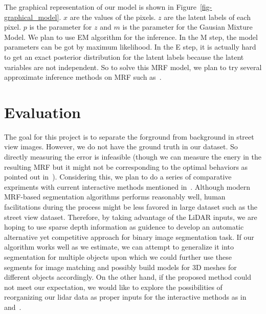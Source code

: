 \documentclass{article} %
\begin{document}
The graphical representation of our model is shown in
Figure~\ref{fig-graphical_model}. $x$ are the values of the
pixels. $z$ are the latent labels of each pixel. $p$ is the parameter
for $z$ and $m$ is the parameter for the Gausian Mixture Model. We
plan to use EM algorithm for the inference. In the M step, the model
parameters can be got by maximum likelihood. In the E step, it is
actually hard to get an exact posterior distribution for the latent
labels because the latent variables are not independent. So to solve
this MRF model, we plan to try several approximate inference methods
on MRF such as~\citep{Boykov2006graph}.

\section{Evaluation}
The goal for this project is to separate the forground from background
in street view images. However, we do not have the ground truth 
in our dataset. So directly measuring the error is infeasible
(though we can measure the enery in the resulting MRF but it 
might not be corresponding to the optimal behaviors as pointed out
in~\citet{Szeliski2008Comparative}). Considering this, we plan to do a series of
comparative expriments with current interactive methods
 mentioned in~\citep{Szeliski2008Comparative}. Although modern
 MRF-based segmentation algorithms performs reasonably well, 
human facilitations during the process might be less favored in large
dataset such as the street view dataset. Therefore,  by taking
advantage of the LiDAR inputs, we are hoping to use sparse depth
information as guidence to develop an automatic alternative yet
competitive approach for binary image segmentation task. 
If our algorithm works well as we estimate, we can attempt
to generalize it into segmentation for multiple objects upon which we
could further use these segments for image matching and possibly build
models for 3D meshes for different objects accordingly. On the other
hand, if the proposed method could not meet our expectation, we would
like to explore the possibilities of reorganizing our lidar data as
proper inputs for the interactive methods as
in~\citep{Rother2004GrabCut} and~\citep{Arbelaez2011Contour}.



\end{document}
